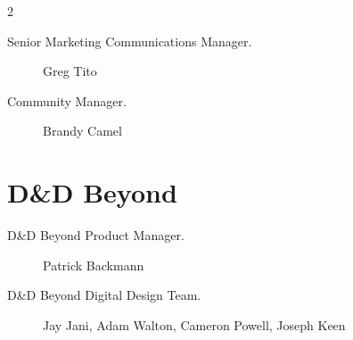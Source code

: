 \documentclass[10pt,a4paper,twoside,bg=print,twocolumn,openany,nodeprecatedcode]{dndbook}
\begin{document}
\begin{description}
\begin{multicols}{2}
\begin{description}
\item[Senior Marketing Communications Manager.]
Greg Tito

\item[Community Manager.]
Brandy Camel

\end{description}

\section{D\&D Beyond}

\begin{description}
\item[D\&D Beyond Product Manager.]
Patrick Backmann

\item[D\&D Beyond Digital Design Team.]
Jay Jani, Adam Walton, Cameron Powell, Joseph Keen

\end{description}

\end{multicols}

\end{description}
\end{document}
